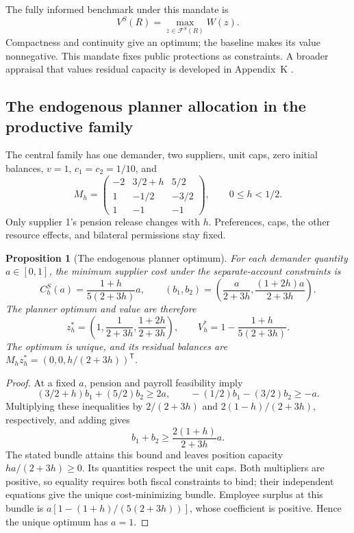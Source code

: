 \documentclass[ecta,draft]{econsocart}
\newtheorem{proposition}[theorem]{Proposition}
\theoremstyle{definition}
\theoremstyle{definition}
\newcommand{\FS}{\mathcal F^{S}}
\begin{document}
The fully informed benchmark under this mandate is
\begin{equation}
 V^S(R)=\max_{z\in\FS(R)}W(z).
 \tag{SP}\label{eq:SP}
\end{equation}
Compactness and continuity give an optimum; the baseline makes its value
nonnegative. This mandate fixes public protections as constraints. A broader
appraisal that values residual capacity is developed in
Appendix~K%
.

\subsection{The endogenous planner allocation in the productive family}
\label{sec:solvedplanner}
\label{sec:localrobustness}

The central family has one demander, two suppliers, unit caps, zero initial
balances, $v=1$, $c_1=c_2=1/10$, and
\[
 M_h=\begin{pmatrix}
 -2&3/2+h&5/2\\
 1&-1/2&-3/2\\
 1&-1&-1
 \end{pmatrix},\qquad 0\leq h<1/2.
\]
Only supplier 1's pension release changes with $h$. Preferences, caps, the
other resource effects, and bilateral permissions stay fixed.

\begin{proposition}[The endogenous planner optimum]
\label{prop:productiveplanner}
For each demander quantity $a\in[0,1]$, the minimum supplier cost under the
separate-account constraints is
\[
 C_h^S(a)=\frac{1+h}{5(2+3h)}a,
 \qquad
 (b_1,b_2)=\left(\frac{a}{2+3h},
                     \frac{(1+2h)a}{2+3h}\right).
\]
The planner optimum and value are therefore
\[
 z_h^*=\left(1,\frac1{2+3h},\frac{1+2h}{2+3h}\right),
 \qquad V_h^*=1-\frac{1+h}{5(2+3h)}.
\]
The optimum is unique, and its residual balances are
$M_hz_h^*=(0,0,h/(2+3h))^{\mathsf T}$.
\end{proposition}

\begin{proof}
At a fixed $a$, pension and payroll feasibility imply
\[
 (3/2+h)b_1+(5/2)b_2\geq2a,
 \qquad -(1/2)b_1-(3/2)b_2\geq-a.
\]
Multiplying these inequalities by $2/(2+3h)$ and
$2(1-h)/(2+3h)$, respectively, and adding gives
\[
 b_1+b_2\geq\frac{2(1+h)}{2+3h}a.
\]
The stated bundle attains this bound and leaves position capacity
$ha/(2+3h)\geq0$. Its quantities respect the unit caps. Both multipliers
are positive, so equality requires both fiscal constraints to bind; their
independent equations give the unique cost-minimizing bundle. Employee surplus
at this bundle is $a[1-(1+h)/(5(2+3h))]$, whose coefficient is positive.
Hence the unique optimum has $a=1$.
\end{proof}
\end{document}
